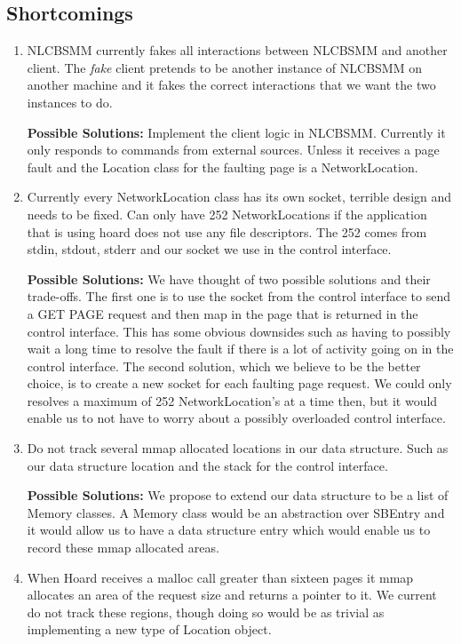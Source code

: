 \documentclass[9pt]{sig-alternate-10pt}
\begin{document}
\subsection{Shortcomings}
\begin{enumerate}
\item NLCBSMM currently fakes all interactions between NLCBSMM and another client. The \emph{fake} client pretends to be another instance of NLCBSMM on another machine and it fakes the correct interactions that we want the two instances to do.

{\bf Possible Solutions:} Implement the client logic in NLCBSMM. Currently it only responds to commands from external sources. Unless it receives a page fault and the Location class for the faulting page is a NetworkLocation.
\item Currently every NetworkLocation class has its own socket, terrible design and needs to be fixed. Can only have 252 NetworkLocations if the application that is using hoard does not use any file descriptors. The 252 comes from stdin, stdout, stderr and our socket we use in the control interface.

{\bf Possible Solutions:} We have thought of two possible solutions and their trade-offs. The first one is to use the socket from the control interface to send a GET PAGE request and then map in the page that is returned in the control interface. This has some obvious downsides such as having to possibly wait a long time to resolve the fault if there is a lot of activity going on in the control interface. The second solution, which we believe to be the better choice, is to create a new socket for each faulting page request. We could only resolves a maximum of 252 NetworkLocation's at a time then, but it would enable us to not have to worry about a possibly overloaded control interface.
\item Do not track several mmap allocated locations in our data structure. Such as our data structure location and the stack for the control interface.

{\bf Possible Solutions:} We propose to extend our data structure to be a list of Memory classes. A Memory class would be an abstraction over SBEntry and it would allow us to have a data structure entry which would enable us to record these mmap allocated areas.
\item When Hoard receives a malloc call greater than sixteen pages it mmap allocates an area of the request size and returns a pointer to it. We current do not track these regions, though doing so would be as trivial as implementing a new type of Location object.


\end{enumerate}
\end{document}
